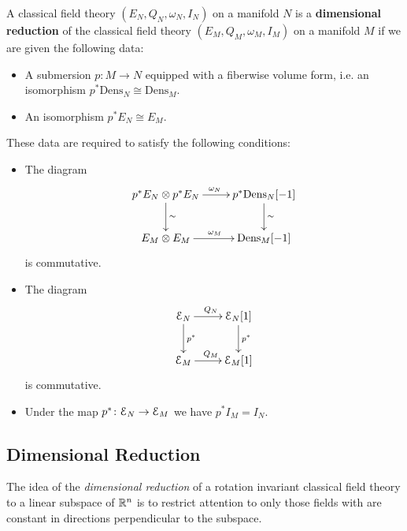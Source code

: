 \documentclass[10pt, oneside]{article}
\newcommand{\Dens}{\mathrm{Dens}}
\begin{document}
\begin{definition}
A classical field theory $(E_N, Q_N, \omega_N, I_N)$ on a manifold $N$ is a {\bf dimensional reduction} of the classical field theory $(E_M, Q_M, \omega_M, I_M)$ on a manifold $M$ if we are given the following data:
\begin{itemize}
\item A submersion $p\colon M\rightarrow N$ equipped with a fiberwise volume form, i.e. an isomorphism $p^*\Dens_N\cong \Dens_M$.

\item An isomorphism $p^* E_N\cong E_M$.
\end{itemize}
These data are required to satisfy the following conditions:
\begin{itemize}
\item The diagram
\[
\xymatrix{
p^* E_N\otimes p^* E_N \ar^{\omega_N}[r] \ar^{\sim}[d] & p^*\Dens_N[-1] \ar^{\sim}[d] \\
E_M\otimes E_M \ar^{\omega_M}[r] & \Dens_M[-1]
}
\]
is commutative.

\item The diagram
\[
\xymatrix{
\cE_N \ar^{Q_N}[r] \ar^{p^*}[d] & \cE_N[1] \ar^{p^*}[d] \\
\cE_M \ar^{Q_M}[r] & \cE_M[1]
}
\]
is commutative.

\item Under the map $p^*\colon \mathcal E_N\rightarrow \mathcal E_M$ we have $p^* I_M = I_N$.
\end{itemize}
\end{definition}


\subsection{Dimensional Reduction} \label{dim_red_section}
The idea of the \emph{dimensional reduction} of a rotation invariant classical field theory to a linear subspace of $\mathbb R^n$ is to restrict attention to only those fields with are constant in directions perpendicular to the subspace. 
\end{document}
